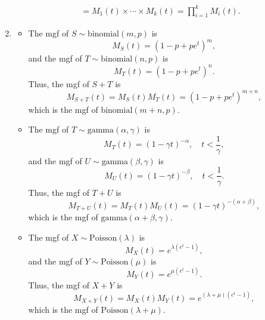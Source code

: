 \documentclass[12pt]{article}
\newenvironment{problem}[2][Problem]{\begin{trivlist}
\item[\hskip \labelsep {\bfseries #1}\hskip \labelsep {\bfseries #2.}]}
{\end{trivlist}}
\begin{document}
\begin{problem}{8}
\begin{enumerate}
\begin{align*}
      &= M_1(t) \times \cdots \times M_k(t) = \prod_{i=1}^k M_i(t).
    \end{align*}
    \item
    \begin{itemize}
      \item[i.] The mgf of $S \sim \text{binomial}(m, p)$ is
      \[
        M_S(t) = (1 - p + p e^t)^m,
      \]
      and the mgf of $T \sim \text{binomial}(n, p)$ is
      \[
        M_T(t) = (1 - p + p e^t)^n.
      \]
      Thus, the mgf of $S + T$ is
      \[
        M_{S+T}(t) = M_S(t) M_T(t) = (1 - p + p e^t)^{m+n},
      \]
      which is the mgf of $\text{binomial}(m+n, p)$.
      \item[ii.] The mgf of $T \sim \text{gamma}(\alpha, \gamma)$ is
      \[
        M_T(t) = (1 - \gamma t)^{-\alpha}, \quad t < \frac{1}{\gamma},
      \]
      and the mgf of $U \sim \text{gamma}(\beta, \gamma)$ is
      \[
        M_U(t) = (1 - \gamma t)^{-\beta}, \quad t < \frac{1}{\gamma}.
      \]
      Thus, the mgf of $T + U$ is
      \[
        M_{T+U}(t) = M_T(t) M_U(t) = (1 - \gamma t)^{-(\alpha + \beta)},
      \]
      which is the mgf of $\text{gamma}(\alpha + \beta, \gamma)$.
      \item[iii.] The mgf of $X \sim \text{Poisson}(\lambda)$ is
      \[
        M_X(t) = e^{\lambda (e^t - 1)},
      \]
      and the mgf of $Y \sim \text{Poisson}(\mu)$ is
      \[
        M_Y(t) = e^{\mu (e^t - 1)}.
      \]
      Thus, the mgf of $X + Y$ is
      \[
        M_{X+Y}(t) = M_X(t) M_Y(t) = e^{(\lambda + \mu) (e^t - 1)},
      \]
      which is the mgf of $\text{Poisson}(\lambda + \mu)$.
    \end{itemize}
  \end{enumerate}
\end{problem}

\end{document}
